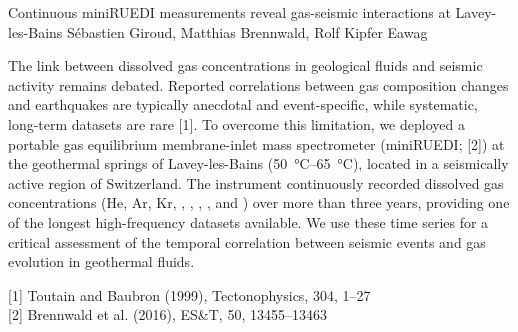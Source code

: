 \begin{conf-abstract}
{Continuous miniRUEDI measurements reveal gas-seismic interactions at Lavey-les-Bains}
{Sébastien Giroud, Matthias Brennwald, Rolf Kipfer}
{Eawag}
{The link between dissolved gas concentrations in geological fluids and seismic activity remains debated. 
Reported correlations between gas composition changes and earthquakes are typically anecdotal and event-specific, while systematic, long-term datasets are rare [1].
To overcome this limitation, we deployed a portable gas equilibrium membrane-inlet mass spectrometer (miniRUEDI; [2]) at the geothermal springs of Lavey-les-Bains (\SIrange{50}{65}{\celsius}), located in a seismically active region of Switzerland. 
The instrument continuously recorded dissolved gas concentrations (He, Ar, Kr, , , , , and ) over more than three years, providing one of the longest high-frequency datasets available. 
We use these time series for a critical assessment of the temporal correlation between seismic events and gas evolution in geothermal fluids.

[1] Toutain and Baubron (1999), Tectonophysics, 304, 1–27\\[1ex]
[2] Brennwald et al. (2016), ES\&T, 50, 13455–13463

}
\end{conf-abstract}

